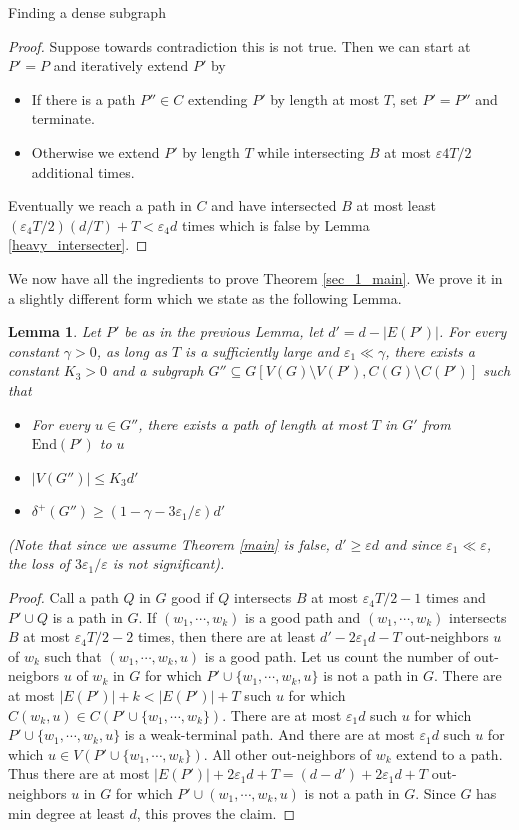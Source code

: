 \documentclass[11pt,a4paper]{article}
\newtheorem{lemma}[subsection]{Lemma}
\newcommand{\vep}{\varepsilon}
\newcommand{\End}{\mathrm{End}}
\begin{document}
\begin{section}{Finding a dense subgraph}
\begin{proof} Suppose towards contradiction this is not true. Then we can start at $P' = P$ and iteratively extend $P'$ by
\begin{itemize}
\item If there is a path $P'' \in C$ extending $P'$ by length at most $T$, set $P' = P''$ and terminate.
\item Otherwise we extend $P'$ by length $T$ while intersecting $B$ at most $\vep 4 T/2$ additional times.
\end{itemize}
Eventually we reach a path in $C$ and have intersected $B$ at most least $(\vep_4 T/2) (d/T) + T < \vep_4 d$ times which is false by Lemma \ref{heavy_intersecter}.
\end{proof}
We now have all the ingredients to prove Theorem \ref{sec_1_main}. We prove it in a slightly different form which we state as the following Lemma.
\begin{lemma} Let $P'$ be as in the previous Lemma, let $d' = d - |E(P')|$. For every constant $\gamma > 0$, as long as $T$ is a sufficiently large and $\vep_1 \ll \gamma$, there exists a constant $K_3 > 0$ and a subgraph $G'' \subseteq G[V(G) \setminus V(P'), C(G) \setminus C(P')]$ such that
\begin{itemize}
\item For every $u \in G''$, there exists a path of length at most $T$ in $G'$ from $\End(P')$ to $u$
\item $|V(G'')| \leq K_3 d'$
\item $\delta^{+}(G'') \geq (1 - \gamma - 3\vep_1/\vep) d' $
\end{itemize}
(Note that since we assume Theorem \ref{main} is false, $d' \geq \vep d$ and since $\vep_1 \ll \vep$, the loss of $3 \vep_1/\vep$ is not significant).
\end{lemma}
\begin{proof}
Call a path $Q$ in $G$ good if $Q$ intersects $B$ at most $\vep_4 T/2 - 1$ times and $P' \cup Q$ is a path in $G$.
\claim If $(w_1, \cdots, w_k)$ is a good path and $(w_1, \cdots, w_k)$ intersects $B$ at most $\vep_4T/2 - 2$ times, then there are at least $d' - 2\vep_1 d - T$ out-neighbors $u$ of $w_k$ such that $(w_1, \cdots, w_k, u)$ is a good path.
\proof Let us count the number of out-neigbors $u$ of $w_k$ in $G$ for which $P' \cup \{w_1, \cdots, w_k, u\}$ is not a path in $G$. There are at most $|E(P')| + k < |E(P')| + T$ such $u$ for which $C(w_k, u) \in C ( P' \cup \{w_1, \cdots, w_k\})$. There are at most $\vep_1 d$ such $u$ for which $P' \cup \{w_1, \cdots, w_k, u\}$ is a weak-terminal path. And there are at most $\vep_1 d$ such $u$ for which $u \in V( P' \cup \{w_1, \cdots, w_k \} )$. All other out-neighbors of $w_k$ extend to a path. Thus there are at most $|E(P')| + 2 \vep_1 d + T = (d - d') + 2 \vep_1 d + T$ out-neighbors $u$ in $G$ for which $P' \cup (w_1, \cdots, w_k, u)$ is not a path in $G$. Since $G$ has min degree at least $d$, this proves the claim.


\end{proof}
\end{section}
\end{document}
